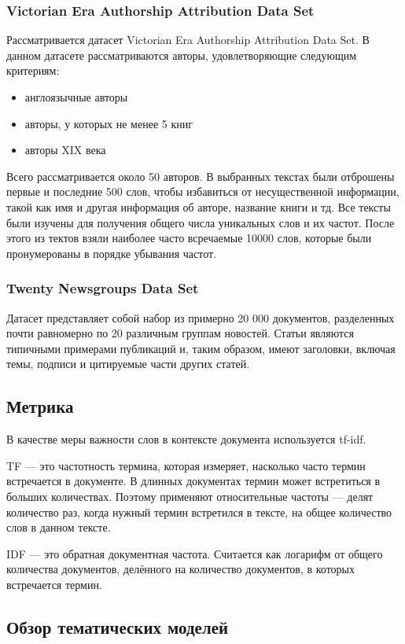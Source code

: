 \documentclass{article}
\begin{document}
\subsubsection{Victorian Era Authorship Attribution Data Set}
Рассматривается датасет Victorian Era Authorship Attribution Data Set. В данном датасете рассматриваются авторы, удовлетворяющие следующим критериям: 
\begin{itemize}
\item англоязычные авторы
\item авторы, у которых не менее 5 книг 
\item авторы XIX века
\end{itemize}
Всего рассматривается около 50 авторов. В выбранных текстах были отброшены первые и последние 500 слов, чтобы избавиться от несущественной информации, такой как имя и другая информация об авторе, название книги и тд. Все тексты были изучены для получения общего числа уникальных слов и их частот. После этого из тектов взяли наиболее часто всречаемые 10000 слов, которые были пронумерованы в порядке убывания частот. 
\subsubsection{Twenty Newsgroups Data Set}
Датасет представляет собой набор из примерно 20 000 документов, разделенных почти равномерно по 20 различным группам новостей. Статьи являются типичными примерами публикаций и, таким образом, имеют заголовки, включая темы, подписи и цитируемые части других статей.
\subsection{Метрика}
В качестве меры важности слов в контексте документа используется tf-idf. 

TF — это частотность термина, которая измеряет, насколько часто термин встречается в документе. В длинных документах термин может встретиться в больших количествах. Поэтому применяют относительные частоты — делят количество раз, когда нужный термин встретился в тексте, на общее количество слов в данном тексте.
 
IDF — это обратная документная частота. Считается как логарифм от общего количества документов, делённого на количество документов, в которых встречается термин.

\subsection{Обзор тематических моделей}
\end{document}
